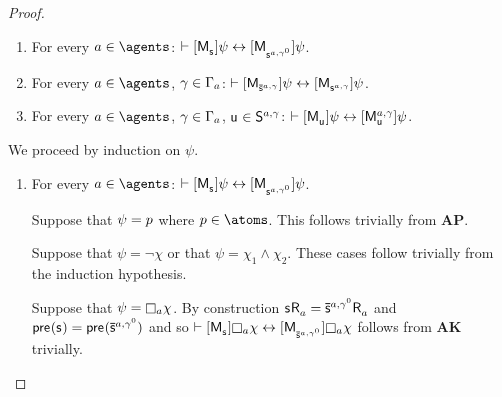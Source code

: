 \begin{proof}
\begin{enumerate}
    \item For every $\agentA \in \agents$: $\proves \actionA{\aPModel{\aStateS}} \psi \iff \actionA{\aPModel{\aStateS[\agentA,\gamma^0]}} \psi$.
    \item For every $\agentA \in \agents$, $\gamma \in \Gamma_a$: $\proves \actionA{\aPModel{\aPStateS[\agentA,\gamma]}} \psi \iff \actionA{\aPModel{\aStateS[\agentA,\gamma]}} \psi$.
    \item For every $\agentA \in \agents$, $\gamma \in \Gamma_a$, $\aStateU \in \aStates[\agentA,\gamma]$: $\proves \actionA{\aPModel{\aStateU}} \psi \iff \actionA{\aPModel[\agentA,\gamma]{\aStateU}} \psi$.
\end{enumerate}

We proceed by induction on $\psi$.

\begin{enumerate}
    \item For every $\agentA \in \agents$: $\proves \actionA{\aPModel{\aStateS}} \psi \iff \actionA{\aPModel{\aStateS[\agentA,\gamma^0]}} \psi$.

        Suppose that $\psi = p$ where $\atomP \in \atoms$. 
        This follows trivially from {\bf AP}.

        Suppose that $\psi = \neg \chi$ or that $\psi = \chi_1 \land \chi_2$.
        These cases follow trivially from the induction hypothesis.

        Suppose that $\psi = \necessaryA \chi$.
        By construction $\aStateS \aAccessibility{\agentA} = \aPStateS[\agentA,\gamma^0] \aAccessibility{\agentA}$ and $\aPrecondition(\aStateS) = \aPrecondition(\aPStateS[\agentA,\gamma^0])$ and so $\proves \actionA{\aPModel{\aStateS}} \necessaryA \chi \iff \actionA{\aPModel{\aPStateS[\agentA,\gamma^0]}} \necessaryA \chi$ follows from {\bf AK} trivially.


\end{enumerate}
\end{proof}
